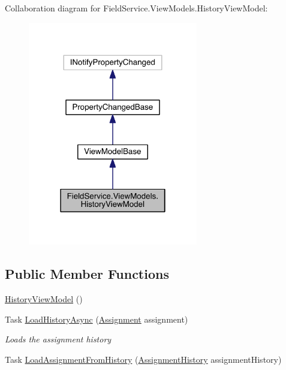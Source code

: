 Collaboration diagram for Field\+Service.\+View\+Models.\+History\+View\+Model\+:
\nopagebreak
\begin{figure}[H]
\begin{center}
\leavevmode
\includegraphics[width=210pt]{class_field_service_1_1_view_models_1_1_history_view_model__coll__graph}
\end{center}
\end{figure}
\subsection*{Public Member Functions}
\begin{DoxyCompactItemize}
\item 
\hyperlink{class_field_service_1_1_view_models_1_1_history_view_model_a45027751a4251a263cbb6848b0708bc9}{History\+View\+Model} ()
\item 
Task \hyperlink{class_field_service_1_1_view_models_1_1_history_view_model_a776d2d468a7a045d0020d52619474f15}{Load\+History\+Async} (\hyperlink{class_field_service_1_1_data_1_1_assignment}{Assignment} assignment)
\begin{DoxyCompactList}\small\item\em Loads the assignment history \end{DoxyCompactList}\item 
Task \hyperlink{class_field_service_1_1_view_models_1_1_history_view_model_a502172061d53c07fcdb2b54b3c33c6cf}{Load\+Assignment\+From\+History} (\hyperlink{class_field_service_1_1_data_1_1_assignment_history}{Assignment\+History} assignment\+History)
\end{DoxyCompactItemize}
